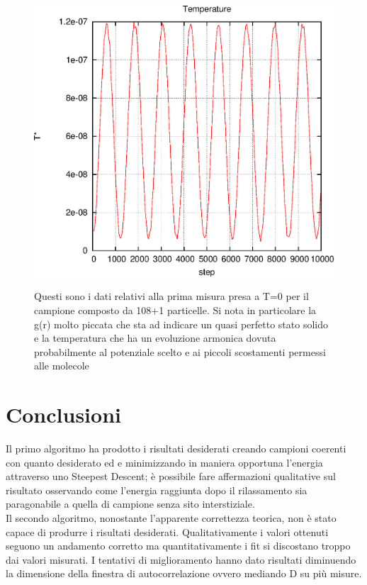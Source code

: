 \documentclass[a4paper,11pt]{article}
\begin{document}
\begin{figure}
					{\includegraphics[scale=0.5]{Temperature_evolution_0.eps}}
					\caption{Questi sono i dati relativi alla prima misura presa a T=0 per il campione composto da 108+1 particelle. Si nota in particolare la g(r) molto piccata che sta ad indicare un quasi perfetto stato solido e la temperatura che ha un evoluzione armonica dovuta probabilmente al potenziale scelto e ai piccoli scostamenti permessi alle molecole}
				\end{figure}
	\newpage
	\section{Conclusioni} %
	\label{sec:conclusioni}
	Il primo algoritmo ha prodotto i risultati desiderati creando campioni coerenti con quanto desiderato ed e minimizzando in maniera opportuna l'energia attraverso uno Steepest Descent; è possibile fare affermazioni qualitative sul risultato osservando come l'energia raggiunta dopo il rilassamento sia paragonabile a quella di campione senza sito interstiziale.\\
	Il secondo algoritmo, nonostante l'apparente correttezza teorica, non è stato capace di produrre i risultati desiderati. Qualitativamente i valori ottenuti seguono un andamento corretto ma quantitativamente i fit si discostano troppo dai valori misurati. I tentativi di miglioramento hanno dato risultati diminuendo la dimensione della finestra di autocorrelazione ovvero mediando D su più misure.
\end{document}
